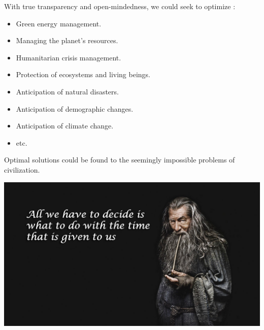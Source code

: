 With true transparency and open-mindedness, we could seek to optimize :\\

\begin{itemize}
\item Green energy management.
\item Managing the planet's resources.
\item Humanitarian crisis management.
\item Protection of ecosystems and living beings.
\item Anticipation of natural disasters.
\item Anticipation of demographic changes.
\item Anticipation of climate change.
\item etc.\\
\end{itemize}

Optimal solutions could be found to the seemingly impossible problems of civilization.\\

\vspace{1cm}

\begin{center}
\includegraphics[scale=0.22]{media/gandalf_quote.jpg}
\end{center}